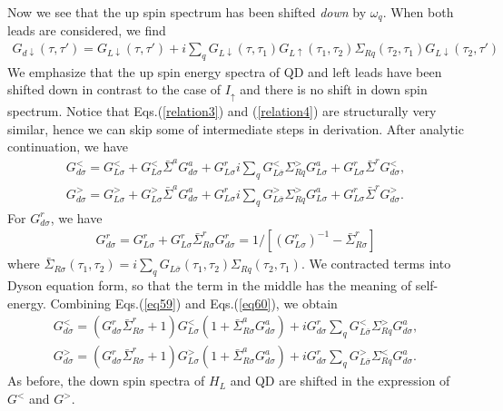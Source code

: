 \documentclass[aps,prb,superscriptaddress]{revtex4-2}
\begin{document}
Now we see that the up spin spectrum has been shifted {\it down} by $\omega_q$. When both leads are considered, we find
\begin{eqnarray}\label{Gd-dn}
G_{d\downarrow}(\tau,\tau') =G_{L\downarrow}(\tau,\tau') + i\sum_q G_{L\downarrow}(\tau,\tau_1)  G_{L\uparrow}(\tau_1,\tau_2)\Sigma_{Rq}(\tau_2,\tau_1) G_{L\downarrow}(\tau_2,\tau')
\end{eqnarray}
We emphasize that the up spin energy spectra of QD and left leads have been shifted down in contrast to the case of $I_\uparrow$ and there is no shift in down spin spectrum. Notice that Eqs.(\ref{relation3}) and (\ref{relation4}) are structurally very similar, hence we can skip some of intermediate steps in derivation. After analytic continuation, we have
\begin{gather}
G^<_{d\sigma} =G^<_{L\sigma} + G^<_{L\sigma}{\bar \Sigma}^a G^a_{d\sigma}
+G^r_{L\sigma} i\sum_q G^<_{L\bar\sigma}\Sigma_{Rq}^> G^a_{L\sigma} + G^r_{L\sigma} {\bar \Sigma}^r G^<_{d\sigma}, \label{eq59}\\
G^>_{d\sigma} =G^>_{L\sigma} + G^>_{L\sigma}{\bar \Sigma}^a G^a_{d\sigma}
+G^r_{L\sigma} i\sum_q G^>_{L\bar\sigma}\Sigma_{Rq}^> G^a_{L\sigma} + G^r_{L\sigma} {\bar \Sigma}^r G^>_{d\sigma}. \label{eq592}
\end{gather}
For $G^r_{d\sigma}$, we have
\begin{eqnarray}
G^r_{d\sigma} =G^r_{L\sigma} + G^r_{L\sigma} {\bar \Sigma}_{R\sigma}^r
G^r_{d\sigma} = 1/[(G^r_{L\sigma})^{-1} - {\bar \Sigma}_{R\sigma}^r]  \label{eq60}
\end{eqnarray}
where ${\bar \Sigma}_{R\sigma}(\tau_1,\tau_2) =i\sum_q G_{L\bar\sigma}(\tau_1,\tau_2)\Sigma_{Rq}(\tau_2,\tau_1)$. We contracted terms into Dyson equation form, so that the term in the middle has the meaning of self-energy. Combining Eqs.(\ref{eq59}) and Eqs.(\ref{eq60}), we obtain
\begin{gather}
G^<_{d\sigma} =(G^r_{d\sigma}{\bar \Sigma}_{R\sigma}^r+1) G^<_{L\sigma} (1+{\bar \Sigma}_{R\sigma}^a
G^a_{d\sigma}) +i G^r_{d\sigma} \sum_q G^<_{L\bar\sigma}\Sigma_{Rq}^> G^a_{d\sigma} \nonumber,\\
G^>_{d\sigma} =(G^r_{d\sigma}{\bar \Sigma}_{R\sigma}^r+1) G^>_{L\sigma} (1+{\bar \Sigma}_{R\sigma}^a
G^a_{d\sigma}) +i G^r_{d\sigma} \sum_q G^>_{L\bar\sigma}\Sigma_{Rq}^< G^a_{d\sigma} \nonumber.
\end{gather}
As before, the down spin spectra of $H_L$ and QD are shifted in the expression of $G^<$ and $G^>$.
\end{document}
